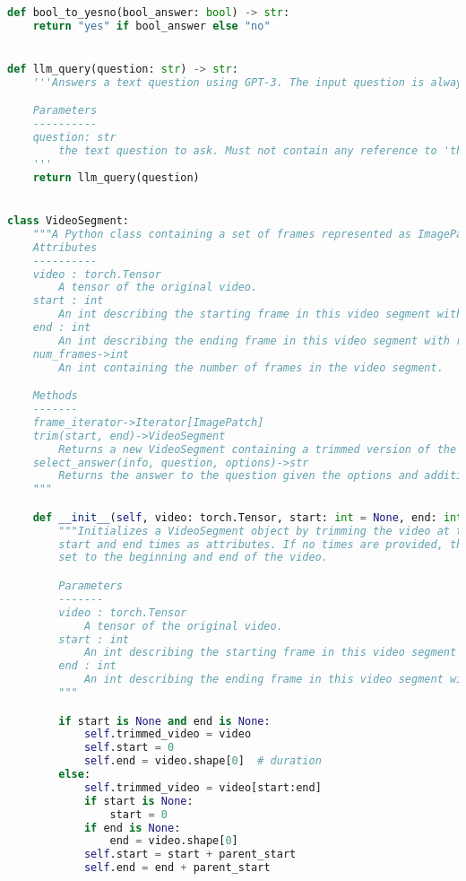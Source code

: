 \documentclass[10pt,twocolumn,letterpaper]{article}
\begin{document}
\begin{lstlisting}[language=Python, xleftmargin=.0\textwidth, xrightmargin=.0\textwidth, caption=\textbf{Full API.}, label={listing}]
def bool_to_yesno(bool_answer: bool) -> str:
    return "yes" if bool_answer else "no"


def llm_query(question: str) -> str:
    '''Answers a text question using GPT-3. The input question is always a formatted string with a variable in it.

    Parameters
    ----------
    question: str
        the text question to ask. Must not contain any reference to 'the image' or 'the photo', etc.
    '''
    return llm_query(question)


class VideoSegment:
    """A Python class containing a set of frames represented as ImagePatch objects, as well as relevant information.
    Attributes
    ----------
    video : torch.Tensor
        A tensor of the original video.
    start : int
        An int describing the starting frame in this video segment with respect to the original video.
    end : int
        An int describing the ending frame in this video segment with respect to the original video.
    num_frames->int
        An int containing the number of frames in the video segment.

    Methods
    -------
    frame_iterator->Iterator[ImagePatch]
    trim(start, end)->VideoSegment
        Returns a new VideoSegment containing a trimmed version of the original video at the [start, end] segment.
    select_answer(info, question, options)->str
        Returns the answer to the question given the options and additional information.
    """

    def __init__(self, video: torch.Tensor, start: int = None, end: int = None, parent_start=0, queues=None):
        """Initializes a VideoSegment object by trimming the video at the given [start, end] times and stores the
        start and end times as attributes. If no times are provided, the video is left unmodified, and the times are
        set to the beginning and end of the video.

        Parameters
        -------
        video : torch.Tensor
            A tensor of the original video.
        start : int
            An int describing the starting frame in this video segment with respect to the original video.
        end : int
            An int describing the ending frame in this video segment with respect to the original video.
        """

        if start is None and end is None:
            self.trimmed_video = video
            self.start = 0
            self.end = video.shape[0]  # duration
        else:
            self.trimmed_video = video[start:end]
            if start is None:
                start = 0
            if end is None:
                end = video.shape[0]
            self.start = start + parent_start
            self.end = end + parent_start


\end{lstlisting}
\end{document}
